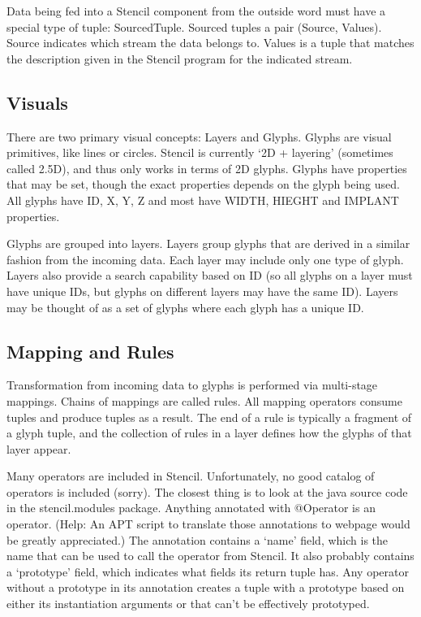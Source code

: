 \documentclass{article}
\begin{document}
Data being fed into a Stencil component from the outside word must have a special type of tuple: SourcedTuple.
Sourced tuples a pair (Source, Values).  
Source indicates which stream the data belongs to. 
Values is a tuple that matches the description given in the Stencil program for the indicated stream.


\subsection{Visuals}
There are two primary visual concepts:  Layers and Glyphs.
Glyphs are visual primitives, like lines or circles.  
Stencil is currently `2D + layering' (sometimes called 2.5D), and thus only works in terms of 2D glyphs.  
Glyphs have properties that may be set, though the exact properties depends on the glyph being used.  
All glyphs have ID, X, Y, Z and most have WIDTH, HIEGHT and IMPLANT properties.

Glyphs are grouped into layers.  
Layers group glyphs that are derived in a similar fashion from the incoming  data.  
Each layer may include only one type of glyph. 
Layers also provide a search capability based on  ID (so all glyphs on a layer must have unique IDs, but glyphs on different layers may have the same ID).  
Layers may be thought of as a set of glyphs where each glyph has a unique ID. 

\subsection{Mapping and Rules}
Transformation from incoming data to glyphs is performed via multi-stage mappings.  
Chains of mappings are called rules.  
All mapping operators consume tuples and produce tuples as a result.
The end of a rule is typically a fragment of a glyph tuple, and the collection of rules in a layer defines how the glyphs of that layer appear.

Many operators are included in Stencil. Unfortunately, no good catalog of operators is included (sorry).
The closest thing is to look at the java source code in the stencil.modules package.
Anything annotated with @Operator is an operator. (Help: An APT script  to translate those annotations to webpage would be greatly appreciated.)
The annotation contains a `name' field, which is the name that can be used to call the operator from Stencil.
It also probably contains a `prototype' field, which indicates what fields its return tuple has.  
Any operator without a prototype in its annotation creates a tuple with a prototype based on either its instantiation arguments or that can't be effectively prototyped.
\end{document}
